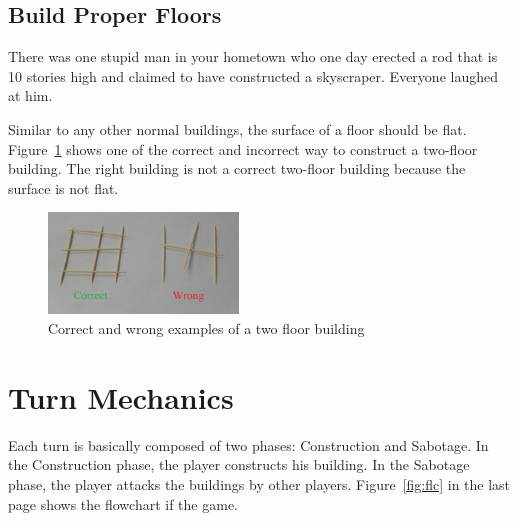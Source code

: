 \documentclass[a4paper, twocolumn, 12pt, twoside, english]{article}
\begin{document}
\subsection{Build Proper Floors}
\begin{tcolorbox}
There was one stupid man in your hometown who one day erected a rod that is 10 stories high and claimed to have constructed a skyscraper. Everyone laughed at him.
\end{tcolorbox}
Similar to any other normal buildings, the surface of a floor should be flat. Figure~\ref{fig:flr} shows one of the correct and incorrect way to construct a two-floor building. The right building is not a correct two-floor building because the surface is not flat.
\begin{figure}[!h]
\centering
\includegraphics[width=0.45\textwidth]{Diagram_floors_2.png}
\caption{Correct and wrong examples of a two floor building}
\label{fig:flr}
\end{figure}

\section{Turn Mechanics}
\label{sec:turn}
Each turn is basically composed of two phases: Construction and Sabotage. In the Construction phase, the player constructs his building. In the Sabotage phase, the player attacks the buildings by other players. Figure~\ref{fig:flc} in the last page shows the flowchart if the game.
\end{document}
